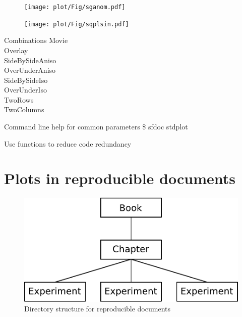 \begin{frame}
  \begin{figure}
  \texttt{[image: plot/Fig/sganom.pdf]}
  \end{figure}
\end{frame}

\begin{frame}
  \begin{figure}
  \texttt{[image: plot/Fig/sqplsin.pdf]}
  \end{figure}
\end{frame}

\begin{frame}
  \begin{block}{Combinations}
    Movie \\
    Overlay \\
    SideBySideAniso \\
    OverUnderAniso \\
    SideBySideIso \\
    OverUnderIso \\
    TwoRows \\
    TwoColumns
  \end{block}
  \begin{block}{Command line help for common parameters}
    \$ sfdoc stdplot
  \end{block}
  \begin{block}{Use functions to reduce code redundancy}
   \vspace{-0.5cm}
   
  \end{block}
\end{frame}

\section{Plots in reproducible documents}

\begin{frame}
  \vspace{0.5cm}
  \begin{figure}
  \includegraphics[scale=0.55]{Fig/pstruct.pdf}
  \caption{Directory structure for reproducible documents}
  \end{figure}
\end{frame}

